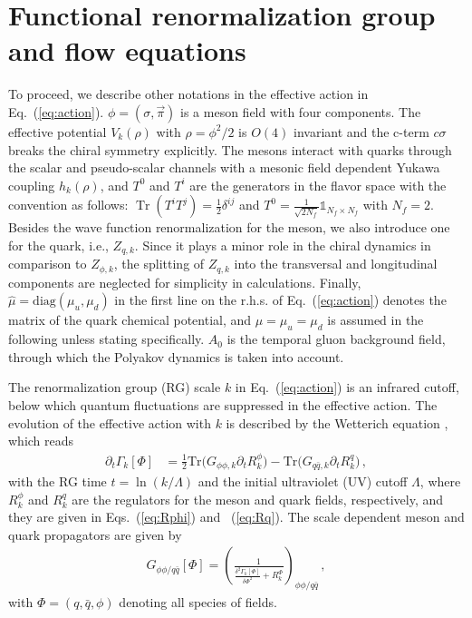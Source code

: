 \documentclass[%
reprint,
superscriptaddress,
showpacs,preprintnumbers,
 amsmath,amssymb,
 aps,
prd,
]{revtex4-1}
\newcommand{\Tr}{\ensuremath{\operatorname{Tr}}}
\def\Eq#1{Eq.~(\ref{#1})}
\begin{document}

\section{Functional renormalization group and flow equations}
\label{sec:FRG}

To proceed, we describe other notations in the effective action in \Eq{eq:action}. $\phi=\left(\sigma,\vec{\pi}\right)$ is a meson field with four components. The effective potential $V_k(\rho)$ with $\rho=\phi^2/2$ is $O(4)$ invariant and the c-term $c\sigma$ breaks the chiral symmetry explicitly. The mesons interact with quarks through the scalar and pseudo-scalar channels with a mesonic field dependent Yukawa coupling $h_k(\rho)$, and $T^0$ and $T^i$ are the generators in the flavor space with the convention as follows: $\Tr(T^{i}T^{j})=\frac{1}{2}\delta^{ij}$ and $T^{0}=\frac{1}{\sqrt{2N_{f}}}\mathbb{1}_{N_{f}\times N_{f}}$ with $N_{f}=2$. Besides the wave function renormalization for the meson, we also introduce one for the quark, i.e., $Z_{q,k}$. Since it plays a minor role in the chiral dynamics in comparison to $Z_{\phi,k}$, the splitting of $Z_{q,k}$ into the transversal and longitudinal components are neglected for simplicity in calculations. Finally, $\hat\mu=\mathrm{diag}(\mu_u,\mu_d)$ in the first line on the r.h.s. of \Eq{eq:action} denotes the matrix of the quark chemical potential, and $\mu=\mu_u=\mu_d$ is assumed in the following unless stating specifically. $A_0$ is the temporal gluon background field, through which the Polyakov dynamics is taken into account.

The renormalization group (RG) scale $k$ in \Eq{eq:action} is an infrared cutoff, below which quantum fluctuations are suppressed in the effective action. The evolution of the effective action with $k$ is described by the Wetterich equation \cite{Wetterich:1992yh}, which reads 
\begin{align}
  \partial_t\Gamma_k[\Phi]&=\frac{1}{2}\mathrm{Tr}\big(G_{\phi\phi,k}\partial_t R^{\phi}_{k}\big)-\mathrm{Tr}\big(G_{q\bar{q},k}\partial_t R^{q}_{k}\big)\,, \label{eq:WetterichEqPQM}
\end{align}
with the RG time $t=\ln (k/\Lambda)$ and the initial ultraviolet (UV) cutoff $\Lambda$, where $R^{\phi}_{k}$ and $R^{q}_{k}$ are the regulators for the meson and quark fields, respectively, and they are given in Eqs.~(\ref{eq:Rphi}) and ~(\ref{eq:Rq}). The scale dependent meson and quark propagators are given by
\begin{align}
  G_{\phi\phi/q\bar{q}}[\Phi]=\left( \frac{1}{\frac{\delta^2\Gamma_k[\Phi]}{\delta\Phi^2}+R^{\Phi}_{k}} \right)_{\phi\phi/q\bar{q}}\,, \label{eq:props}
\end{align}
with $\Phi=(q,\bar q,\phi)$ denoting all species of fields.
\end{document}
